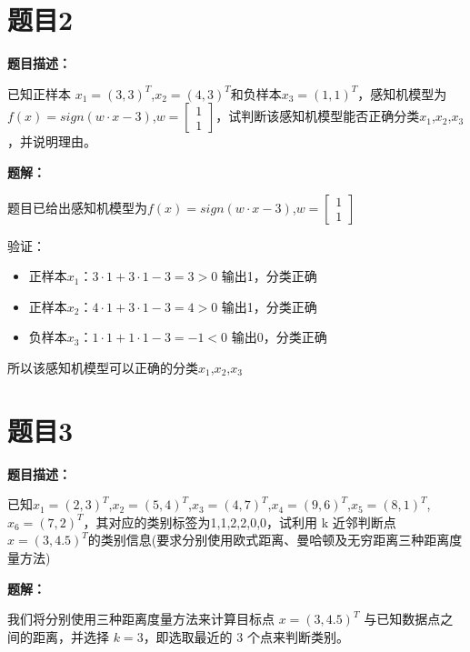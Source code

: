 \documentclass[UTF8]{ctexart}
\begin{document}
	
	
	\section{题目2}
	\textbf{题目描述：}
	
	已知正样本 $x_1=(3,3)^T$,$x_2=(4,3)^T$和负样本$x_3=(1,1)^T$，感知机模型为$f(x)=sign(w \cdot x - 3)$,$w=\begin{bmatrix}1\\1\end{bmatrix}$，试判断该感知机模型能否正确分类$x_1$,$x_2$,$x_3$，并说明理由。
	
	
	\textbf{题解：}
	
	题目已给出感知机模型为$f(x)=sign(w \cdot x - 3)$,$w=\begin{bmatrix}1\\1\end{bmatrix}$
	
	验证：
	\begin{itemize}
		\item 正样本$x_1$：$3\cdot1 + 3\cdot1 - 3 = 3 > 0$ 输出1，分类正确
		\item 正样本$x_2$：$4\cdot1 + 3\cdot1 - 3 = 4 > 0$ 输出1，分类正确
		\item 负样本$x_3$：$1\cdot1 + 1\cdot1 - 3 = -1 < 0$ 输出0，分类正确
	\end{itemize}
	
	所以该感知机模型可以正确的分类$x_1$,$x_2$,$x_3$
	
	
	
	\section{题目3}
	\textbf{题目描述：}
	
	已知$x_1=(2,3)^T$,$x_2=(5,4)^T$,$x_3=(4,7)^T$,$x_4=(9,6)^T$,$x_5=(8,1)^T$,$x_6=(7,2)^T$，其对应的类别标签为1,1,2,2,0,0，试利用 k 近邻判断点$x=(3,4.5)^T$的类别信息(要求分别使用欧式距离、曼哈顿及无穷距离三种距离度量方法)
	
	
	\textbf{题解：}
	
	我们将分别使用三种距离度量方法来计算目标点 $x=(3,4.5)^T$ 与已知数据点之间的距离，并选择 $k=3$，即选取最近的 3 个点来判断类别。
	
\end{document}
